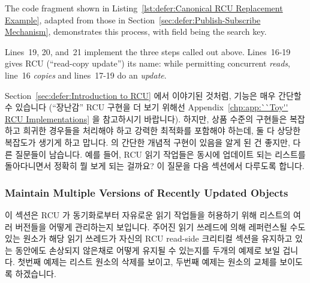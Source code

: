 The code fragment shown in
Listing~\ref{lst:defer:Canonical RCU Replacement Example},
adapted from those in Section~\ref{sec:defer:Publish-Subscribe Mechanism},
demonstrates this process, with field  being the search key.

Lines~19, 20, and~21 implement the three steps called out above.
Lines~16-19 gives RCU (``read-copy update'') its name: while permitting
concurrent \emph{reads}, line~16 \emph{copies} and lines~17-19
do an \emph{update}.
\fi

Section~\ref{sec:defer:Introduction to RCU} 에서 이야기된 것처럼,
 기능은 매우 간단할 수 있습니다 (``장난감'' RCU 구현을 더
보기 위해선
Appendix~\ref{chp:app:``Toy'' RCU Implementations} 을 참고하시기
바랍니다).
하지만, 상품 수준의 구현들은 복잡하고 희귀한 경우들을 처리해야 하고 강력한
최적화를 포함해야 하는데, 둘 다 상당한 복잡도가 생기게 하고 맙니다.
 의 간단한 개념적 구현이 있음을 알게 된 건 좋지만, 다른
질문들이 남습니다.
예를 들어, RCU 읽기 작업들은 동시에 업데이트 되는 리스트를 돌아다니면서 정확히
뭘 보게 되는 걸까요?
이 질문을 다음 섹션에서 다루도록 합니다.

\subsubsection{Maintain Multiple Versions of Recently Updated Objects}
\label{sec:defer:Maintain Multiple Versions of Recently Updated Objects}

이 섹션은 RCU 가 동기화로부터 자유로운 읽기 작업들을 허용하기 위해 리스트의
여러 버전들을 어떻게 관리하는지 보입니다.
주어진 읽기 쓰레드에 의해 레퍼런스될 수도 있는 원소가 해당 읽기 쓰레드가 자신의
RCU read-side 크리티컬 섹션을 유지하고 있는 동안에도 손상되지 않은채로 어떻게
유지될 수 있는지를 두개의 예제로 보일 겁니다.
첫번째 예제는 리스트 원소의 삭제를 보이고, 두번째 예제는 원소의 교체를 보이도록
하겠습니다.
\iffalse

